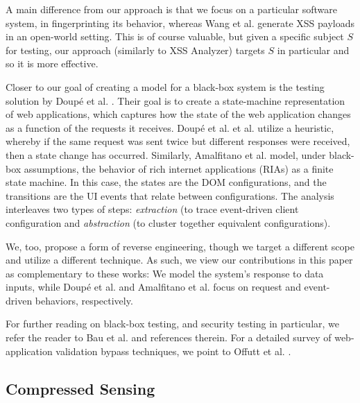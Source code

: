 A main difference from our approach is that we focus on a particular software system, in fingerprinting its behavior, whereas Wang et al. generate XSS payloads in an open-world setting. This is of course valuable, but given a specific subject $S$ for testing, our approach (similarly to XSS Analyzer) targets $S$ in particular and so it is more effective.

Closer to our goal of creating a model for a black-box system is the testing solution by Doup\'e et al. \cite{Doupe:2012}. Their goal is to create a state-machine representation of web applications, which captures
how the state of the web application changes as a function of the requests it receives. Doup\'e et al. et al. utilize a heuristic, whereby if the same request was sent twice but different responses were received, then a state change has occurred. Similarly, Amalfitano et al. \cite{Amalfitano:FT08} model, under black-box assumptions, the behavior of rich internet applications (RIAs) as a finite state machine. In this case, the states are the DOM configurations, and the transitions are the UI events that relate between configurations. The analysis interleaves two types of steps: \emph{extraction} (to trace event-driven client configuration and \emph{abstraction} (to cluster together equivalent configurations).

We, too, propose a form of reverse engineering, though we target a different scope and utilize a different technique. As such, we view our contributions in this paper as complementary to these works: We model the system's response to data inputs, while Doup\'e et al. and Amalfitano et al. focus on request and event-driven behaviors, respectively.

For further reading on black-box testing, and security testing in particular, we refer the reader to Bau et al. \cite{Bau:2010} and references therein. For a detailed survey of web-application validation bypass techniques, we point to Offutt et al. \cite{Offutt1,Offutt2,Offutt3}. 

\subsection{Compressed Sensing}

